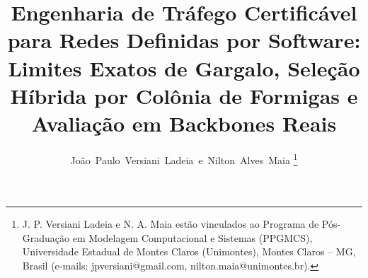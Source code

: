 \documentclass[journal]{IEEEtran}
\begin{document}
\title{Engenharia de Tráfego Certificável para Redes Definidas por Software:
Limites Exatos de Gargalo, Seleção Híbrida por Colônia de Formigas e
Avaliação em Backbones Reais}
\author{João~Paulo~Versiani~Ladeia~e~Nilton~Alves~Maia%
\thanks{J. P. Versiani Ladeia e N. A. Maia estão vinculados ao Programa de
Pós-Graduação em Modelagem Computacional e Sistemas (PPGMCS), Universidade
Estadual de Montes Claros (Unimontes), Montes Claros -- MG, Brasil
(e-mails: jpversiani@gmail.com, nilton.maia@unimontes.br).}}


\maketitle
\end{document}
